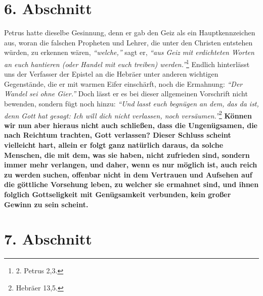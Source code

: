 \section{6. Abschnitt} \label{kap13_ab6}

Petrus hatte dieselbe Gesinnung, denn er gab den Geiz
als ein Hauptkennzeichen
aus, woran die falschen Propheten und Lehrer,
die unter den Christen entstehen
würden, zu erkennen wären, \textit{"`welche,"'} sagt er, \textit{"`aus Geiz mit
erdichteten
Worten an euch hantieren (oder Handel mit euch treiben) werden."'}\footnote{2. Petrus 2,3.}
Endlich hinterlässt uns der Verfasser der Epistel an die Hebräer
unter anderen wichtigen Gegenstände, die er mit warmen Eifer einschärft, noch die
Ermahnung: \textit{"`Der Wandel sei ohne Gier."'} Doch lässt er es bei dieser
allgemeinen
Vorschrift nicht bewenden, sondern fügt noch hinzu:
\textit{"`Und lasst euch begnügen an
dem, das da ist, denn Gott hat gesagt: Ich will dich nicht verlassen, noch
versäumen."'}\footnote{Hebräer 13,5.}
 \label{ref:13_06_reichtum_unersaettlichkeit}
\textbf{Können wir nun aber hieraus nicht auch
schließen, dass die Ungenügsamen, die nach
Reichtum trachten, Gott verlassen?
Dieser Schluss scheint vielleicht hart, allein er folgt ganz natürlich daraus, da
solche Menschen, die mit dem, was sie haben, nicht zufrieden sind, sondern immer
mehr verlangen, und daher, wenn es nur möglich ist, auch reich zu werden suchen,
offenbar nicht in dem Vertrauen und Aufsehen auf die göttliche Vorsehung leben,
zu welcher sie ermahnet sind, und ihnen folglich Gottseligkeit mit Genügsamkeit
verbunden, kein großer Gewinn zu sein scheint.}

\section{7. Abschnitt} \label{kap13_ab7}

